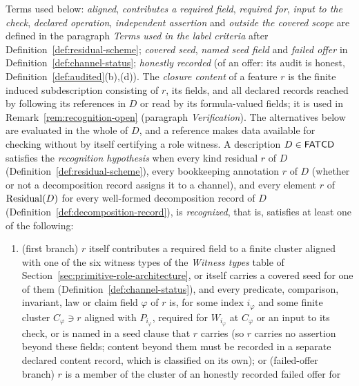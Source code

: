 \begin{definition}\label{def:recognition-hypothesis}
Terms used below: \emph{aligned}, \emph{contributes a required field},
\emph{required for}, \emph{input to the check}, \emph{declared operation},
\emph{independent assertion} and \emph{outside the covered scope} are defined in
the paragraph \emph{Terms used in the label criteria} after
Definition~\ref{def:residual-scheme}; \emph{covered seed}, \emph{named seed
field} and \emph{failed offer} in Definition~\ref{def:channel-status};
\emph{honestly recorded} (of an offer: its audit is honest,
Definition~\ref{def:audited}(b),(d)).
The \emph{closure content} of a feature \(r\) is the finite induced
subdescription consisting of \(r\), its fields, and all declared records
reached by following its references in \(D\) or read by its formula-valued fields; it is used in
Remark~\ref{rem:recognition-open} (paragraph \emph{Verification}). The alternatives below are evaluated in the
whole of \(D\), and a reference makes data available for checking without by
itself certifying a role witness. A description \(D \in \mathsf{FATCD}{}\)
satisfies the \emph{recognition hypothesis} when every kind residual \(r\)
of \(D\) (Definition~\ref{def:residual-scheme}), every bookkeeping annotation \(r\) of \(D\) (whether or not a decomposition record assigns it to a channel), and every
element \(r\) of \(\operatorname{Residual}\!\left(D\right)\) for every well-formed decomposition record
of \(D\) (Definition~\ref{def:decomposition-record}), is \emph{recognized}, that is,
satisfies at least one of the following:
\begin{enumerate}[label=(R\arabic*),topsep=2pt,itemsep=1pt]
  \item (first branch) \(r\) itself contributes a required field to a finite cluster aligned
    with one of the six witness types of the \emph{Witness types} table of Section~\ref{sec:primitive-role-architecture},
    or itself carries a covered seed for one of them
    (Definition~\ref{def:channel-status}), and every predicate, comparison, invariant, law or claim field \(\varphi\) of \(r\) is, for some index \(i_\varphi\) and some finite cluster \(C_\varphi\ni r\) aligned with \(P_{i_\varphi}\), required for \(W_{i_\varphi}\) at \(C_\varphi\) or an input to its check, or is named in a seed clause that \(r\) carries (so \(r\) carries no assertion beyond these fields; content beyond them must be recorded in a separate declared content record, which is classified on its own); or (failed-offer branch)
    \(r\) is a member of the cluster of an honestly recorded failed offer for

\end{enumerate}
\end{definition}

